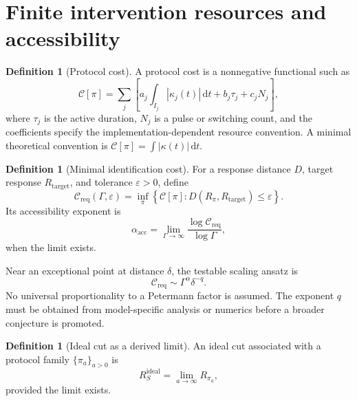 \documentclass[11pt]{article}
\theoremstyle{definition}
\newtheorem{definition}[theorem]{Definition}
\theoremstyle{remark}
\newcommand{\dd}{\,\mathrm d}
\newcommand{\cC}{\mathcal C}
\newcommand{\eps}{\varepsilon}
\begin{document}
\section{Finite intervention resources and accessibility}

\begin{definition}[Protocol cost]\label{def:cost}
A protocol cost is a nonnegative functional such as
\begin{equation}
\boxed{
\cC[\pi]
 = \sum_j\left[
 a_j\int_{I_j}|\kappa_j(t)|\dd t
 + b_j\tau_j+c_jN_j
 \right],
}
\label{eq:protocol-cost}
\end{equation}
where $\tau_j$ is the active duration, $N_j$ is a pulse or switching count, and the coefficients specify the implementation-dependent resource convention. A minimal theoretical convention is $\cC[\pi]=\int|\kappa(t)|\dd t$.
\end{definition}

\begin{definition}[Minimal identification cost]\label{def:minimal-cost}
For a response distance $D$, target response $R_{\mathrm{target}}$, and tolerance $\eps>0$, define
\begin{equation}
\boxed{
\cC_{\mathrm{req}}(\Gamma,\eps)
 = \inf_{\pi}\left\{
 \cC[\pi]:D(R_{\pi},R_{\mathrm{target}})\le\eps
 \right\}.
}
\label{eq:minimal-cost}
\end{equation}
Its accessibility exponent is
\begin{equation}
\boxed{
\alpha_{\mathrm{acc}}
 = \lim_{\Gamma\to\infty}
 \frac{\log\cC_{\mathrm{req}}}{\log\Gamma},
}
\label{eq:accessibility-exponent}
\end{equation}
when the limit exists.
\end{definition}

Near an exceptional point at distance $\delta$, the testable scaling ansatz is
\begin{equation}
\cC_{\mathrm{req}}\sim\Gamma^{\alpha}\delta^{-q}.
\label{eq:ep-cost}
\end{equation}
No universal proportionality to a Petermann factor is assumed. The exponent $q$ must be obtained from model-specific analysis or numerics before a broader conjecture is promoted.

\begin{definition}[Ideal cut as a derived limit]\label{def:ideal-cut}
An ideal cut associated with a protocol family $\{\pi_a\}_{a>0}$ is
\begin{equation}
R_S^{\mathrm{ideal}}=\lim_{a\to\infty}R_{\pi_a},
\label{eq:ideal-cut}
\end{equation}
provided the limit exists.
\end{definition}
\end{document}
